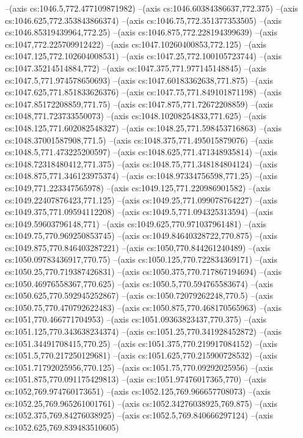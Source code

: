 --(axis cs:1046.5,772.477109871982)
--(axis cs:1046.60384386637,772.375)
--(axis cs:1046.625,772.353843866374)
--(axis cs:1046.75,772.351377353505)
--(axis cs:1046.85319439964,772.25)
--(axis cs:1046.875,772.228194399639)
--(axis cs:1047,772.225709912422)
--(axis cs:1047.10260400853,772.125)
--(axis cs:1047.125,772.102604008531)
--(axis cs:1047.25,772.100105723744)
--(axis cs:1047.35214514884,772)
--(axis cs:1047.375,771.977145148845)
--(axis cs:1047.5,771.974578650693)
--(axis cs:1047.60183362638,771.875)
--(axis cs:1047.625,771.851833626376)
--(axis cs:1047.75,771.849101871198)
--(axis cs:1047.85172208859,771.75)
--(axis cs:1047.875,771.72672208859)
--(axis cs:1048,771.723733550073)
--(axis cs:1048.10208254833,771.625)
--(axis cs:1048.125,771.602082548327)
--(axis cs:1048.25,771.598453716863)
--(axis cs:1048.37001587908,771.5)
--(axis cs:1048.375,771.495015879076)
--(axis cs:1048.5,771.473225200597)
--(axis cs:1048.625,771.471348935814)
--(axis cs:1048.72318480412,771.375)
--(axis cs:1048.75,771.348184804124)
--(axis cs:1048.875,771.346123975374)
--(axis cs:1048.97334756598,771.25)
--(axis cs:1049,771.223347565978)
--(axis cs:1049.125,771.220986901582)
--(axis cs:1049.22407876423,771.125)
--(axis cs:1049.25,771.099078764227)
--(axis cs:1049.375,771.09594112208)
--(axis cs:1049.5,771.094325313594)
--(axis cs:1049.59603796148,771)
--(axis cs:1049.625,770.971037961481)
--(axis cs:1049.75,770.969250853745)
--(axis cs:1049.84640328722,770.875)
--(axis cs:1049.875,770.846403287221)
--(axis cs:1050,770.844261240489)
--(axis cs:1050.09783436917,770.75)
--(axis cs:1050.125,770.722834369171)
--(axis cs:1050.25,770.719387426831)
--(axis cs:1050.375,770.717867194694)
--(axis cs:1050.46976558367,770.625)
--(axis cs:1050.5,770.594765583674)
--(axis cs:1050.625,770.592945252867)
--(axis cs:1050.72079262248,770.5)
--(axis cs:1050.75,770.470792622483)
--(axis cs:1050.875,770.468170565963)
--(axis cs:1051,770.466771704953)
--(axis cs:1051.09363823437,770.375)
--(axis cs:1051.125,770.343638234374)
--(axis cs:1051.25,770.341928452872)
--(axis cs:1051.34491708415,770.25)
--(axis cs:1051.375,770.219917084152)
--(axis cs:1051.5,770.217250129681)
--(axis cs:1051.625,770.215900728532)
--(axis cs:1051.71792025956,770.125)
--(axis cs:1051.75,770.09292025956)
--(axis cs:1051.875,770.091175429813)
--(axis cs:1051.97476017365,770)
--(axis cs:1052,769.974760173651)
--(axis cs:1052.125,769.966657708073)
--(axis cs:1052.25,769.965261001761)
--(axis cs:1052.34276038925,769.875)
--(axis cs:1052.375,769.84276038925)
--(axis cs:1052.5,769.840666297124)
--(axis cs:1052.625,769.839483510605)
